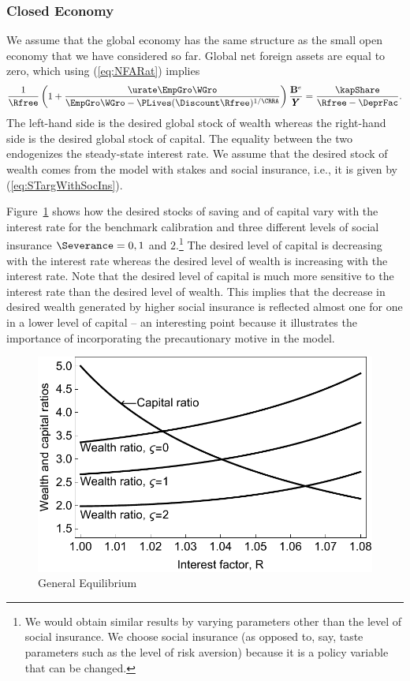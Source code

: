\documentclass[titlepage]{\econtex}\newcommand{\texname}{cjSOE}
\renewcommand{\GDPLev}{\ensuremath{\pmb{Y}}}
\begin{document}
\subsubsection{Closed Economy}

We assume that the global economy has the same structure as the small
open economy that we have considered so far.  Global net foreign
assets are equal to zero, which using (\ref{eq:NFARat}) implies
\begin{equation}
\frac{1}{\Rfree} \left( 1 + \frac{\urate \EmpGro \WGro}{\EmpGro \WGro -\PLives(\Discount \Rfree )^{1/\CRRA}} \right) \frac{\BLevE}{\GDPLev} =\frac{\kapShare}{\Rfree-\DeprFac}.
\label{eq:closed}
\end{equation}
The left-hand side is the desired global stock of wealth whereas the
right-hand side is the desired global stock of capital. The equality
between the two endogenizes the steady-state interest rate. We assume
that the desired stock of wealth comes from the model with stakes and
social insurance, i.e., it is given by (\ref{eq:STargWithSocIns}).

Figure~\ref{fig:genEqbm} shows how the desired stocks of saving and of capital vary
with the interest rate for the benchmark calibration and three
different levels of social insurance $\Severance=0, 1$ and
$2$.\footnote{We would obtain similar results by varying parameters
  other than the level of social insurance. We choose social insurance
  (as opposed to, say, taste parameters such as the level of risk
  aversion) because it is a policy variable that can be changed.} The
desired level of capital is decreasing with the interest rate whereas
the desired level of wealth is increasing with the interest rate. Note
that the desired level of capital is much more sensitive to the
interest rate than the desired level of wealth. This implies that the
decrease in desired wealth generated by higher social insurance is
reflected almost one for one in a lower level of capital -- an interesting
point because it illustrates the importance of incorporating the precautionary
motive in the model.

\medskip

\begin{figure}
\includegraphics{./Figures/genEqbm}
\caption{General Equilibrium}\label{fig:genEqbm}
\end{figure}
\end{document}
